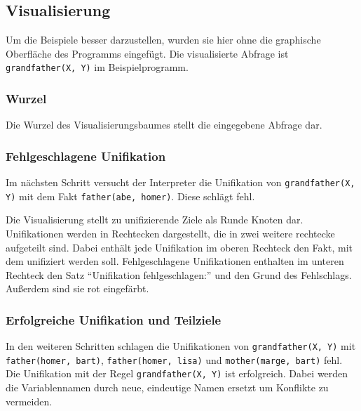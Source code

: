 \documentclass[parskip=full,11pt,twoside]{scrartcl}
\begin{document}
\subsection{Visualisierung}

Um die Beispiele besser darzustellen, wurden sie hier ohne die graphische Oberfläche des Programms eingefügt.
Die visualisierte Abfrage ist \texttt{grandfather(X, Y)} im Beispielprogramm.

\subsubsection{Wurzel}

\begin{minipage}{\linewidth}
\end{minipage}

Die Wurzel des Visualisierungsbaumes stellt die eingegebene Abfrage dar.

\subsubsection{Fehlgeschlagene Unifikation}

Im nächsten Schritt versucht der Interpreter die Unifikation von \texttt{grandfather(X, Y)} mit dem Fakt \texttt{father(abe, homer)}.
Diese schlägt fehl.

\begin{minipage}{\linewidth}
\end{minipage}

Die Visualisierung stellt zu unifizierende Ziele als Runde Knoten dar.
Unifikationen werden in  Rechtecken dargestellt, die in zwei weitere rechtecke aufgeteilt sind.
Dabei enthält jede Unifikation im oberen Rechteck den Fakt, mit dem unifiziert werden soll.
Fehlgeschlagene Unifikationen enthalten im unteren Rechteck den Satz \enquote{Unifikation fehlgeschlagen:} und den Grund des Fehlschlags.
Außerdem sind sie rot eingefärbt.

\subsubsection{Erfolgreiche Unifikation und Teilziele}

In den weiteren Schritten schlagen die Unifikationen von \texttt{grandfather(X, Y)} mit \texttt{father(homer, bart)}, \texttt{father(homer, lisa)} und \texttt{mother(marge, bart)} fehl.
Die Unifikation mit der Regel \texttt{grandfather(X, Y)} ist erfolgreich.
Dabei werden die Variablennamen durch neue, eindeutige Namen ersetzt um Konflikte zu vermeiden.
\end{document}
